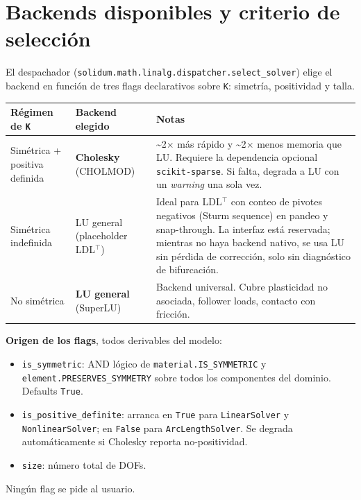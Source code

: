 \documentclass[11pt,letterpaper,oneside]{report}
\begin{document}
\section{Backends disponibles y criterio de selección}

El despachador (\texttt{solidum.math.linalg.dispatcher.select\_solver}) elige el backend en función de tres flags declarativos sobre \texttt{K}: simetría, positividad y talla.

\begin{center}
\begin{tabularx}{\textwidth}{YYY}
\hline
\textbf{Régimen de \texttt{K}} & \textbf{Backend elegido} & \textbf{Notas} \\
\hline
Simétrica + positiva definida & \textbf{Cholesky} (CHOLMOD) & \textasciitilde{}2\ensuremath{\times} más rápido y \textasciitilde{}2\ensuremath{\times} menos memoria que LU. Requiere la dependencia opcional \texttt{scikit-sparse}. Si falta, degrada a LU con un \textit{warning} una sola vez. \\
Simétrica indefinida & LU general (placeholder LDL\ensuremath{^{\top}}) & Ideal para LDL\ensuremath{^{\top}} con conteo de pivotes negativos (Sturm sequence) en pandeo y snap-through. La interfaz está reservada; mientras no haya backend nativo, se usa LU sin pérdida de corrección, solo sin diagnóstico de bifurcación. \\
No simétrica & \textbf{LU general} (SuperLU) & Backend universal. Cubre plasticidad no asociada, follower loads, contacto con fricción. \\
\hline
\end{tabularx}
\end{center}
\textbf{Origen de los flags}, todos derivables del modelo:
\begin{itemize}
  \item \texttt{is\_symmetric}: AND lógico de \texttt{material.IS\_SYMMETRIC} y \texttt{element.PRESERVES\_SYMMETRY} sobre todos los componentes del dominio. Defaults \texttt{True}.
  \item \texttt{is\_positive\_definite}: arranca en \texttt{True} para \texttt{LinearSolver} y \texttt{NonlinearSolver}; en \texttt{False} para \texttt{ArcLengthSolver}. Se degrada automáticamente si Cholesky reporta no-positividad.
  \item \texttt{size}: número total de DOFs.
\end{itemize}

Ningún flag se pide al usuario.
\end{document}
